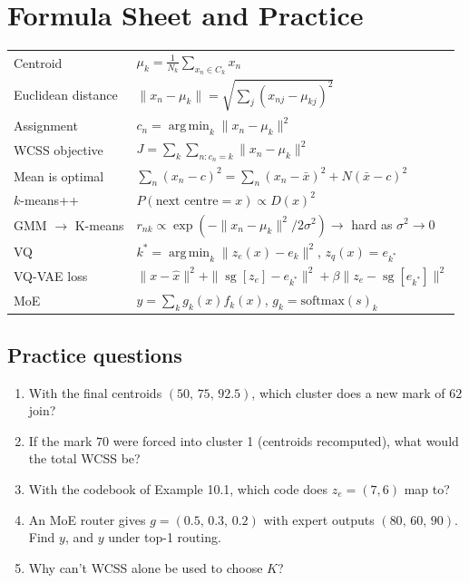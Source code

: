 \documentclass[11pt,a4paper]{article}
\newcommand{\sg}{\operatorname{sg}}
\DeclareMathOperator*{\argmin}{arg\,min}
\begin{document}
\section{Formula Sheet and Practice}

\begin{center}
\renewcommand{\arraystretch}{1.5}
\begin{tabular}{@{}ll@{}}
\toprule
Centroid & $\mu_k=\frac{1}{N_k}\sum_{x_n\in C_k}x_n$\\
Euclidean distance & $\|x_n-\mu_k\|=\sqrt{\sum_j(x_{nj}-\mu_{kj})^2}$\\
Assignment & $c_n=\argmin_k\|x_n-\mu_k\|^2$\\
WCSS objective & $J=\sum_k\sum_{n:c_n=k}\|x_n-\mu_k\|^2$\\
Mean is optimal & $\sum_n(x_n-c)^2=\sum_n(x_n-\bar x)^2+N(\bar x-c)^2$\\
$k$-means++ & $P(\text{next centre}=x)\propto D(x)^2$\\
GMM $\to$ K-means & $r_{nk}\propto\exp(-\|x_n-\mu_k\|^2/2\sigma^2)\to$ hard as $\sigma^2\to0$\\
VQ & $k^\ast=\argmin_k\|z_e(x)-e_k\|^2$, \quad $z_q(x)=e_{k^\ast}$\\
VQ-VAE loss & $\|x-\hat x\|^2+\|\sg[z_e]-e_{k^\ast}\|^2+\beta\|z_e-\sg[e_{k^\ast}]\|^2$\\
MoE & $y=\sum_kg_k(x)f_k(x)$, \quad $g_k=\mathrm{softmax}(s)_k$\\
\bottomrule
\end{tabular}
\end{center}

\subsection*{Practice questions}
\begin{enumerate}
\item With the final centroids $(50,\,75,\,92.5)$, which cluster does a new mark of $62$ join?
\item If the mark $70$ were forced into cluster 1 (centroids recomputed), what would the total WCSS be?
\item With the codebook of Example 10.1, which code does $z_e=(7,6)$ map to?
\item An MoE router gives $g=(0.5,\,0.3,\,0.2)$ with expert outputs $(80,\,60,\,90)$. Find $y$, and $y$ under top-1 routing.
\item Why can't WCSS alone be used to choose $K$?
\end{enumerate}
\end{document}
